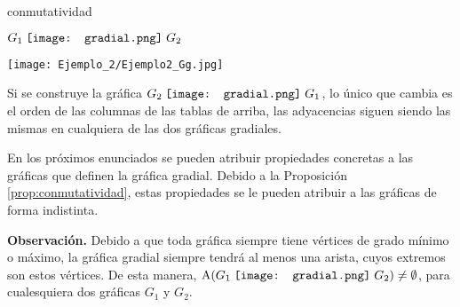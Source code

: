 \documentclass[fleqn, 11pt]{beamer}
\newcommand{\gradial}{\hspace{0.9mm} \texttt{[image: gradial.png]} \hspace{1mm}}
\begin{document}
\begin{ejemplo}[beforeafter skip = 4mm]{}{conmutatividad}
\begin{center}
\begin{minipage}[h]{0.25\linewidth}
                $ G_1 \gradial G_2 $

                \texttt{[image: Ejemplo\_2/Ejemplo2\_Gg.jpg]}
            \end{minipage}
        \end{center} \vspace{3mm}

        Si se construye la gráfica $ G_2 \gradial G_1 $, lo único que cambia es el orden de las columnas de las tablas de arriba, las adyacencias siguen siendo las mismas en cualquiera de las dos gráficas gradiales.
    \end{ejemplo}

    En los próximos enunciados se pueden atribuir propiedades concretas a las gráficas que definen la gráfica gradial. Debido a la Proposición \eqref{prop:conmutatividad}, estas propiedades se le pueden atribuir a las gráficas de forma indistinta.

    \textbf{Observación.} Debido a que toda gráfica siempre tiene vértices de grado mínimo o máximo, la gráfica gradial siempre tendrá al menos una arista, cuyos extremos son estos vértices. De esta manera, \mbox{$ \textnormal{A}(G_1 \gradial G_2) \neq \emptyset $}, para cualesquiera dos gráficas $ G_1 $ y $ G_2 $.
\end{document}
